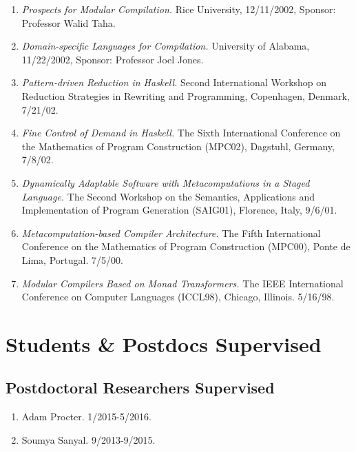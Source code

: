 \documentclass[12pt]{article} %
\begin{document}
\begin{enumerate}[leftmargin=0mm]
\item{\it Prospects for Modular Compilation.}
Rice University, 12/11/2002, Sponsor: Professor Walid Taha.

\item{\it Domain-specific Languages for Compilation.}
University of Alabama, 11/22/2002, Sponsor: Professor Joel Jones.

\item{\it Pattern-driven Reduction in Haskell.} Second International Workshop on Reduction Strategies in Rewriting and Programming, Copenhagen, Denmark, 7/21/02.

\item{\emph{Fine Control of Demand in Haskell.}} The Sixth International Conference on the Mathematics of Program Construction (MPC02), Dagstuhl, Germany, 7/8/02. 

\item{\it Dynamically Adaptable Software with Metacomputations in a Staged Language.} The Second Workshop on the Semantics, Applications and Implementation of Program Generation (SAIG01), Florence, Italy, 9/6/01. 

\item{\it Metacomputation-based Compiler Architecture.} The Fifth International Conference on the Mathematics of Program Construction (MPC00), Ponte de Lima, Portugal. 7/5/00. 

\item{\it Modular Compilers Based on Monad Transformers.} The IEEE International Conference on Computer Languages (ICCL98), Chicago, Illinois. 5/16/98.

\end{enumerate}


\section*{Students \& Postdocs Supervised}
\subsection*{Postdoctoral Researchers Supervised}

\begin{enumerate}[leftmargin=0.0mm]
\item Adam Procter. 1/2015-5/2016.
\item Soumya Sanyal. 9/2013-9/2015.
\end{enumerate}
\end{document}
